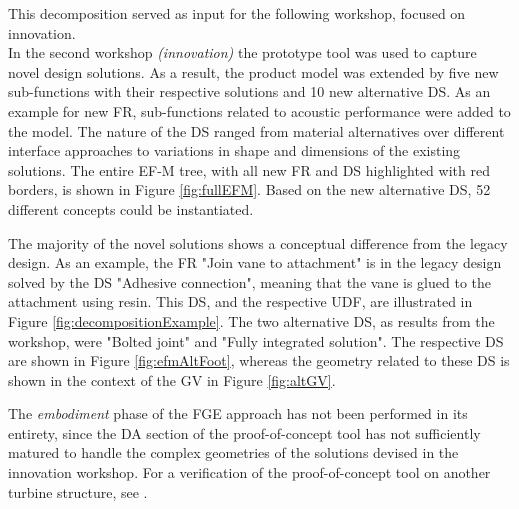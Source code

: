 \documentclass[aerospace,article,submit,moreauthors,pdftex]{Definitions/mdpi}
\begin{document}
This decomposition served as input for the following workshop, focused on innovation. 
\\



In the second workshop \textit{(innovation)} the prototype tool was used to capture novel design solutions.
As a result, the product model was extended by five new sub-functions with their respective solutions and 10 new alternative \ac{DS}.
As an example for new FR, sub-functions related to acoustic performance were added to the model. 
The nature of the \ac{DS} ranged from material alternatives over different interface approaches to variations in shape and dimensions of the existing solutions.
The entire EF-M tree, with all new FR and DS highlighted with red borders, is shown in Figure \ref{fig:fullEFM}.
Based on the new alternative DS, 52 different concepts could be instantiated.


The majority of the novel solutions shows a conceptual difference from the legacy design.
As an example, the \ac{FR} "Join vane to attachment" is in the legacy design solved by the \ac{DS} "Adhesive connection", meaning that the vane is glued to the attachment using resin.
This DS, and the respective UDF, are illustrated in Figure \ref{fig:decompositionExample}.
The two alternative \ac{DS}, as results from the workshop, were "Bolted joint" and "Fully integrated solution".
The respective DS are shown in Figure \ref{fig:efmAltFoot}, whereas the geometry related to these DS is shown in the context of the GV in Figure \ref{fig:altGV}.

The \textit{embodiment} phase of the \ac{FGE} approach has not been performed in its entirety, since the \ac{DA} section of the proof-of-concept tool has not sufficiently matured to handle the complex geometries of the solutions devised in the innovation workshop. For a verification of the proof-of-concept tool on another turbine structure, see \citep{Muller2021FunctionVariants}.
\end{document}
